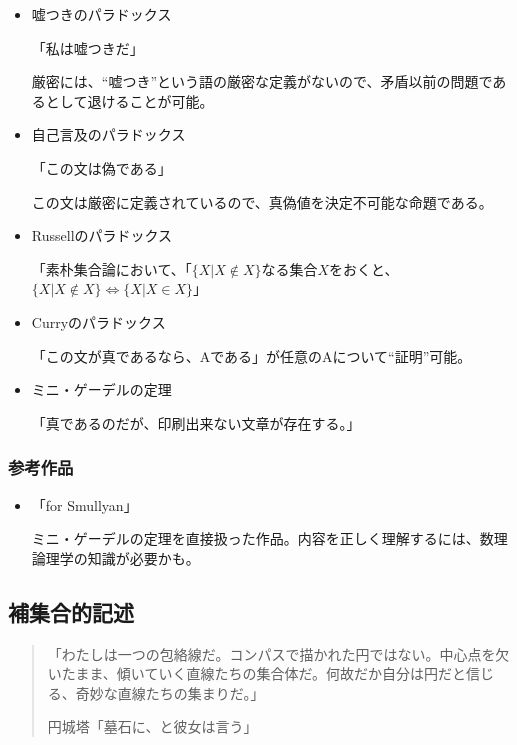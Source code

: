 \documentclass[10pt, a5paper, twoside]{jsarticle}
\begin{document}
				\begin{itemize}

					\item 嘘つきのパラドックス

						「私は嘘つきだ」

						厳密には、“嘘つき”という語の厳密な定義がないので、矛盾以前の問題であるとして退けることが可能。

					\item 自己言及のパラドックス

						「この文は偽である」

						この文は厳密に定義されているので、真偽値を決定不可能な命題である。

					\item Russellのパラドックス

						「素朴集合論において、「$ \{ X | X \notin X \} $なる集合$X$をおくと、$ \{ X | X \notin X \} \Leftrightarrow \{ X | X \in X \}$」

					\item Curryのパラドックス

						「この文が真であるなら、Aである」が任意のAについて“証明”可能。

					\item ミニ・ゲーデルの定理

						「真であるのだが、印刷出来ない文章が存在する。」

				\end{itemize}

			\subsubsection*{参考作品}

				\begin{itemize}
		
					\item 「for Smullyan」
					
						ミニ・ゲーデルの定理を直接扱った作品。内容を正しく理解するには、数理論理学の知識が必要かも。

				\end{itemize}

		\subsection{補集合的記述}

			\begin{quote}

				「わたしは一つの包絡線だ。コンパスで描かれた円ではない。中心点を欠いたまま、傾いていく直線たちの集合体だ。何故だか自分は円だと信じる、奇妙な直線たちの集まりだ。」

				\hspace{\fill}円城塔「墓石に、と彼女は言う」

			\end{quote}
			
\end{document}
